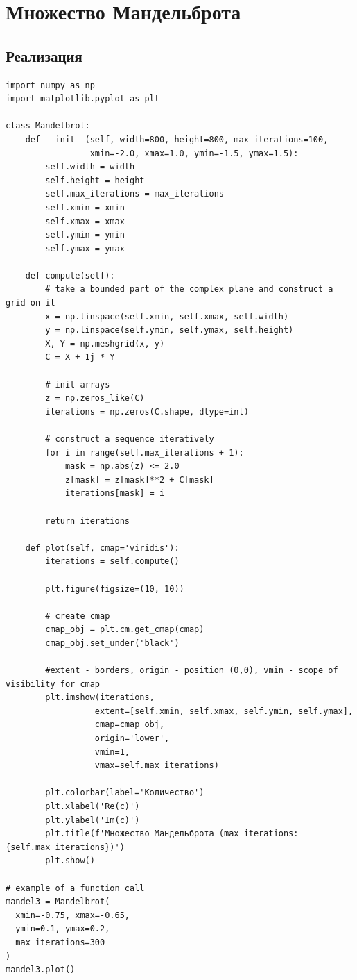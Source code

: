 \section{Множество Мандельброта}

\subsection{Реализация}

\begin{lstlisting}[caption=Построение множества Мандельброта]
import numpy as np
import matplotlib.pyplot as plt

class Mandelbrot:
    def __init__(self, width=800, height=800, max_iterations=100, 
                 xmin=-2.0, xmax=1.0, ymin=-1.5, ymax=1.5):
        self.width = width
        self.height = height
        self.max_iterations = max_iterations
        self.xmin = xmin
        self.xmax = xmax
        self.ymin = ymin
        self.ymax = ymax
        
    def compute(self):
        # take a bounded part of the complex plane and construct a grid on it
        x = np.linspace(self.xmin, self.xmax, self.width)
        y = np.linspace(self.ymin, self.ymax, self.height)
        X, Y = np.meshgrid(x, y)
        C = X + 1j * Y
        
        # init arrays
        z = np.zeros_like(C)
        iterations = np.zeros(C.shape, dtype=int)
        
        # construct a sequence iteratively
        for i in range(self.max_iterations + 1):
            mask = np.abs(z) <= 2.0
            z[mask] = z[mask]**2 + C[mask]
            iterations[mask] = i
        
        return iterations
    
    def plot(self, cmap='viridis'):
        iterations = self.compute()
        
        plt.figure(figsize=(10, 10))
        
        # create cmap
        cmap_obj = plt.cm.get_cmap(cmap)
        cmap_obj.set_under('black')
        
        #extent - borders, origin - position (0,0), vmin - scope of visibility for cmap
        plt.imshow(iterations, 
                  extent=[self.xmin, self.xmax, self.ymin, self.ymax],
                  cmap=cmap_obj, 
                  origin='lower',
                  vmin=1,
                  vmax=self.max_iterations)
        
        plt.colorbar(label='Количество')
        plt.xlabel('Re(c)')
        plt.ylabel('Im(c)')
        plt.title(f'Множество Мандельброта (max iterations: {self.max_iterations})')
        plt.show()

# example of a function call
mandel3 = Mandelbrot(
  xmin=-0.75, xmax=-0.65,
  ymin=0.1, ymax=0.2,
  max_iterations=300
)
mandel3.plot()
\end{lstlisting}

